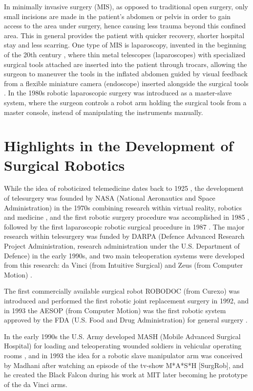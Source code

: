 In minimally invasive surgery (MIS), as opposed to traditional open surgery, only small incisions are made in the patient's abdomen or pelvis in order to gain access to the area under surgery, hence causing less trauma beyond this confined area. This in general provides the patient with quicker recovery, shorter hospital stay and less scarring.
One type of MIS is laparoscopy, invented in the beginning of the 20th century \citep{bib:laparoscopy}, where thin metal telescopes (laparoscopes) with specialized surgical tools attached are inserted into the patient through trocars, allowing the surgeon to maneuver the tools in the inflated abdomen guided by visual feedback from a flexible miniature camera (endoscope) inserted alongside the surgical tools \citep{bib:fascrs}.
In the 1980s robotic laparoscopic surgery was introduced as a master-slave system, where the surgeon controls a robot arm holding the surgical tools from a master console, instead of manipulating the instruments manually.

\section{Highlights in the Development of Surgical Robotics}
While the idea of roboticized telemedicine dates back to 1925 \citep{bib:telemed_predict}, the development of telesurgery was founded by NASA (National Aeronautics and Space Administration) in the 1970s \citep{bib:telesurg_history} combining research within virtual reality, robotics and medicine \citep{bib:brown_univ}, and the first robotic surgery procedure was accomplished in 1985 \citep{bib:telesurg_history}, followed by the first laparoscopic robotic surgical procedure in 1987 \citep{bib:brown_univ}.
The major research within telesurgery was funded by DARPA (Defence Advanced Research Project Administration, research administration under the U.S. Department of Defence) in the early 1990s, and two main teleoperation systems were developed from this research: da Vinci (from Intuitive Surgical) and Zeus (from Computer Motion) \citep{bib:telesurg_history}.

The first commercially available surgical robot ROBODOC (from Curexo) was introduced and performed the first robotic joint replacement surgery in 1992, and in 1993 the AESOP (from Computer Motion) was the first robotic system approved by the FDA (U.S. Food and Drug Administration) for general surgery \citep{bib:telesurg_history}.

In the early 1990s the U.S. Army developed MASH (Mobile Advanced Surgical Hospital) for loading and teleoperating wounded soldiers in vehicular operating rooms \citep{bib:brown_univ}, and in 1993 the idea for a robotic slave manipulator arm was conceived by Madhani after watching an episode of the tv-show M*A*S*H [SurgRob], and he created the Black Falcon during his work at MIT \citep{bib:black_falcon} later becoming he prototype of the da Vinci arms.

